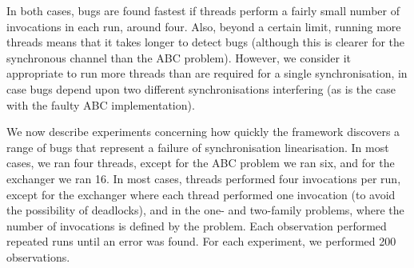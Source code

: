 
In both cases, bugs are found fastest if threads perform a fairly small number
of invocations in each run, around four.  Also, beyond a certain limit,
running more threads means that it takes longer to detect bugs (although this
is clearer for the synchronous channel than the ABC problem).  However, we
consider it appropriate to run more threads than are required for a single
synchronisation, in case bugs depend upon two different synchronisations
interfering (as is the case with the faulty ABC implementation).




We now describe experiments concerning how quickly the framework discovers a
range of bugs that represent a failure of synchronisation linearisation.  In
most cases, we ran four threads, except for the ABC problem we ran six, and
for the exchanger we ran 16.  In most cases, threads performed four
invocations per run, except for the exchanger where each thread performed one
invocation (to avoid the possibility of deadlocks), and in the one- and
two-family problems, where the number of invocations is defined by the
problem.  Each observation performed repeated runs until an error was found.
For each experiment, we performed 200 observations.


